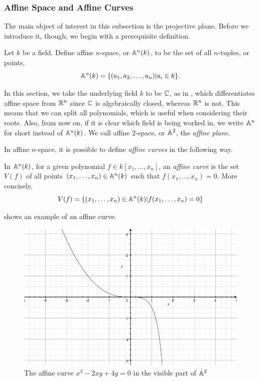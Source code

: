 \subsubsection{Affine Space and Affine Curves}
The main object of interest in this subsection is the projective plane.
Before we introduce it, though, we begin with a prerequisite definition.

\begin{definition}
	Let $k$ be a field.
	Define affine $n$-space, or $\an(k)$, to be the set of all $n$-tuples, or points,
	$$\an(k) = \{ (a_1,a_2,\ldots,a_n) | a_i \in k\}.$$
\end{definition}

In this section, we take the underlying field $k$ to be $\C$, as in \cite{bix2006,323-lectures}, which differentiates affine space from $\R^n$ since $\C$ is algebraically closed, whereas $\R^n$ is not.
This means that we can split all polynomials, which is useful when considering their roots.
Also, from now on, if it is clear which field is being worked in, we write $\an$ for short instead of $\an(k)$.
We call affine 2-space, or $\an[2]$, the \emph{affine plane}.

In affine $n$-space, it is possible to define \emph{affine curves} in the following way.
\begin{definition}
	In $\an(k)$, for a given polynomial $f \in k[x_1,\ldots,x_n]$, an \emph{affine curve} is the set $V(f)$ of all points $(x_1,\ldots,x_n) \in \an(k)$ such that $f(x_1,\ldots,x_n)=0$.
	More concisely,
	$$V(f) = \{(x_1,\ldots,x_n)\in\an(k) | f(x_1,\ldots,x_n)=0\}$$
\end{definition}
 shows an example of an affine curve.

\begin{figure}[htbp]
	\centering
	\includegraphics[scale=0.3]{../Figures/affineexample.jpg}
	\caption{The affine curve $x^3 - 2xy + 4y = 0$ in the visible part of $\an[2]$}
	\label{affinecurveexample}
\end{figure}

